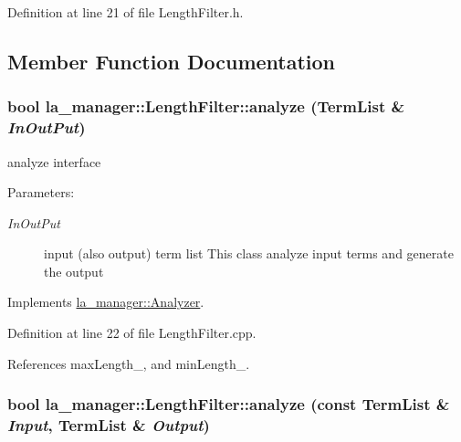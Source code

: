 Definition at line 21 of file LengthFilter.h.

\subsection{Member Function Documentation}
\hypertarget{classla__manager_1_1LengthFilter_0b26aaa94ed79a49609fb92e25109831}{
\subsubsection[{analyze}]{\setlength{\rightskip}{0pt plus 5cm}bool la\_\-manager::LengthFilter::analyze ({\bf TermList} \& {\em InOutPut})}}
\label{classla__manager_1_1LengthFilter_0b26aaa94ed79a49609fb92e25109831}


analyze interface 

\begin{Desc}
\item[Parameters:]
\begin{description}
\item[{\em InOutPut}]input (also output) term list This class analyze input terms and generate the output \end{description}
\end{Desc}


Implements \hyperlink{classla__manager_1_1Analyzer_23414b773ec2070957e9aa3d6a7d8b78}{la\_\-manager::Analyzer}.

Definition at line 22 of file LengthFilter.cpp.

References maxLength\_\-, and minLength\_\-.\hypertarget{classla__manager_1_1LengthFilter_9a4d7237f42892d2ed54ab22d3411741}{
\subsubsection[{analyze}]{\setlength{\rightskip}{0pt plus 5cm}bool la\_\-manager::LengthFilter::analyze (const {\bf TermList} \& {\em Input}, \/  {\bf TermList} \& {\em Output})}}
\label{classla__manager_1_1LengthFilter_9a4d7237f42892d2ed54ab22d3411741}


